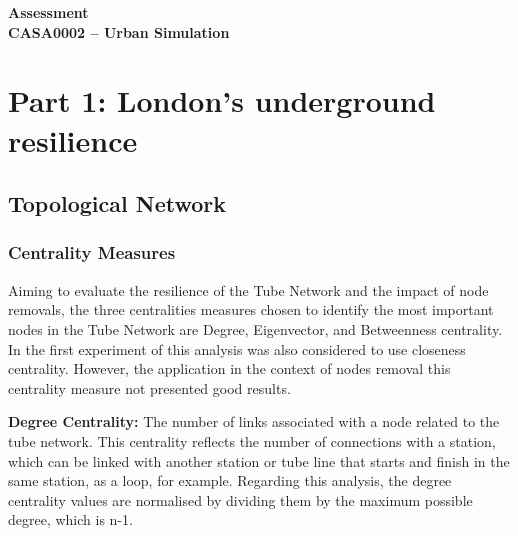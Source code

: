 \documentclass[10pt]{report}
\author{Felipe Santos Almeida}
\numberwithin{figure}{section}
\numberwithin{table}{section}
\begin{document}

\begin{center}
    \vspace*{-3cm}
\end{center}   
    {\LARGE\textbf{Assessment\\
    CASA0002 – Urban Simulation\\}}
    

\section{Part 1: London’s underground resilience}


 \subsection{Topological Network}
\subsubsection{Centrality Measures } 
        
         Aiming to evaluate the resilience of the Tube Network and the impact of node removals, the three centralities measures chosen to identify the most important nodes in the Tube Network are Degree, Eigenvector, and Betweenness centrality. In the first experiment of this analysis was also considered to use closeness centrality. However, the application in the context of nodes removal this centrality measure not presented good results.  
        
        \vspace{5mm} %
        
        \textbf{Degree Centrality:} The number of links associated with a node related to the tube network. This centrality reflects the number of connections with a station, which can be linked with another station or tube line that starts and finish in the same station, as a loop, for example. Regarding this analysis, the degree centrality values are normalised by dividing them by the maximum possible degree, which is n-1. 
\end{document}
